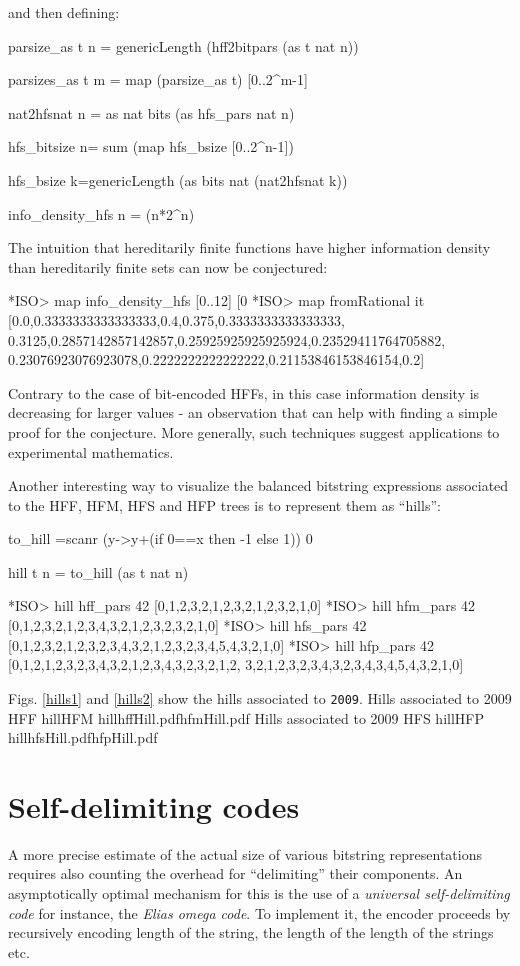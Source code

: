 \documentclass[]{INCLUDES/llncs}
\begin{document}
and then defining:
\begin{code}
parsize_as t n = genericLength (hff2bitpars (as t nat n))

parsizes_as t m = map (parsize_as t) [0..2^m-1]
 
nat2hfsnat n = as nat bits (as hfs_pars nat n)

hfs_bitsize n= sum (map hfs_bsize [0..2^n-1])

hfs_bsize k=genericLength (as bits nat (nat2hfsnat k)) 
  
info_density_hfs n = (n*2^n)%
\end{code}
The intuition that hereditarily finite functions have higher information
density than hereditarily finite sets can now be conjectured:
\begin{codex}
*ISO> map info_density_hfs [0..12]
[0%
*ISO> map fromRational it
[0.0,0.3333333333333333,0.4,0.375,0.3333333333333333,
 0.3125,0.2857142857142857,0.25925925925925924,0.23529411764705882,
 0.23076923076923078,0.2222222222222222,0.21153846153846154,0.2]
\end{codex}
Contrary to the case of bit-encoded HFFs, in this case
information density is decreasing for larger values - an observation
that can help with finding a simple proof for the conjecture.
More generally, such techniques suggest applications to
experimental mathematics.

Another interesting way to visualize the balanced bitstring expressions
associated to the HFF, HFM, HFS and HFP trees is to represent them as
``hills'':
\begin{code}
to_hill =scanr (\x y->y+(if 0==x then -1 else 1)) 0 

hill t n = to_hill (as t nat n)
\end{code}
\begin{codex}
*ISO> hill hff_pars 42
[0,1,2,3,2,1,2,3,2,1,2,3,2,1,0]
*ISO> hill hfm_pars 42
[0,1,2,3,2,1,2,3,4,3,2,1,2,3,2,3,2,1,0]
*ISO> hill hfs_pars 42
[0,1,2,3,2,1,2,3,2,3,4,3,2,1,2,3,2,3,4,5,4,3,2,1,0]
*ISO> hill hfp_pars 42
[0,1,2,1,2,3,2,3,4,3,2,1,2,3,4,3,2,3,2,1,2,
 3,2,1,2,3,2,3,4,3,2,3,4,3,4,5,4,3,2,1,0]
\end{codex}
Figs. \ref{hills1} and \ref{hills2} show the hills associated to {\tt 2009}.
{Hills associated to 2009}
{HFF hill}{HFM hill}{hffHill.pdf}{hfmHill.pdf}
{Hills associated to 2009}
{HFS hill}{HFP hill}{hfsHill.pdf}{hfpHill.pdf}

\section{Self-delimiting codes} \label{selfdelim}
A more precise estimate of the actual size of various bitstring representations
requires also counting the overhead for ``delimiting'' their components.
An asymptotically optimal mechanism for this is the use of a {\em universal
self-delimiting code} for instance, the {\em Elias omega code}.
To implement it, the encoder proceeds by recursively encoding length of the
string, the length of the length of the strings etc.
\end{document}
